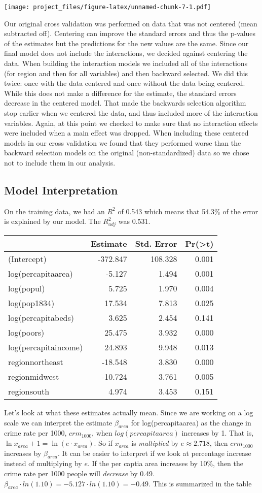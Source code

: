 \documentclass[]{article}
\begin{document}
\texttt{[image: project\_files/figure-latex/unnamed-chunk-7-1.pdf]}

Our original cross validation was performed on data that was not
centered (mean subtracted off). Centering can improve the standard
errors and thus the p-values of the estimates but the predictions for
the new values are the same. Since our final model does not include the
interactions, we decided against centering the data. When building the
interaction models we included all of the interactions (for region and
then for all variables) and then backward selected. We did this twice:
once with the data centered and once without the data being centered.
While this does not make a difference for the estimate, the standard
errors decrease in the centered model. That made the backwards selection
algorithm stop earlier when we centered the data, and thus included more
of the interaction variables. Again, at this point we checked to make
sure that no interaction effects were included when a main effect was
dropped. When including these centered models in our cross validation we
found that they performed worse than the backward selection models on
the original (non-standardized) data so we chose not to include them in
our analysis.

\subsection{Model Interpretation}\label{model-interpretation}

On the training data, we had an \(R^2\) of 0.543 which means that 54.3\%
of the error is explained by our model. The \(R_{adj}^2\) was 0.531.

\begin{longtable}[]{@{}lrrr@{}}
\toprule
& Estimate & Std. Error &
Pr(\textgreater{}\textbar{}t\textbar{})\tabularnewline
\midrule
\endhead
(Intercept) & -372.847 & 108.328 & 0.001\tabularnewline
log(percapitaarea) & -5.127 & 1.494 & 0.001\tabularnewline
log(popul) & 5.725 & 1.970 & 0.004\tabularnewline
log(pop1834) & 17.534 & 7.813 & 0.025\tabularnewline
log(percapitabeds) & 3.625 & 2.454 & 0.141\tabularnewline
log(poors) & 25.475 & 3.932 & 0.000\tabularnewline
log(percapitaincome) & 24.893 & 9.948 & 0.013\tabularnewline
regionnortheast & -18.548 & 3.830 & 0.000\tabularnewline
regionmidwest & -10.724 & 3.761 & 0.005\tabularnewline
regionsouth & 4.974 & 3.453 & 0.151\tabularnewline
\bottomrule
\end{longtable}

Let's look at what these estimates actually mean. Since we are working
on a log scale we can interpret the estimate \(\beta_{area}\) for
log(percapitaarea) as the change in crime rate per 1000, \(crm_{1000}\),
when \(log(percapitaarea)\) increases by 1. That is,
\(\ln x_{area} + 1 = \ln(e \cdot x_{area})\). So if \(x_{area}\) is
\emph{multiplied} by \(e \approx 2.718\), then \(crm_{1000}\) increases
by \(\beta_{area}\). It can be easier to interpret if we look at
percentage increase instead of multiplying by \(e\). If the per captia
area increases by 10\%, then the crime rate per 1000 people will
\emph{decrease} by 0.49.
\(\beta_{area} \cdot ln(1.10) = -5.127 \cdot ln(1.10) = -0.49\). This is
summarized in the table
\end{document}

